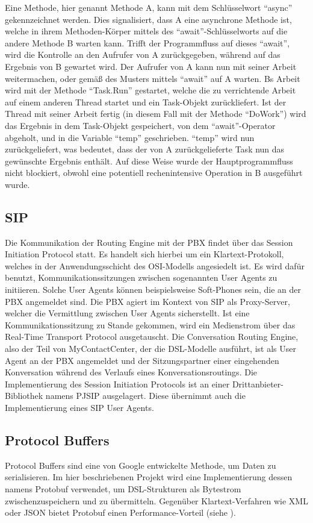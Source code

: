Eine Methode, hier genannt Methode A, kann mit dem Schlüsselwort ``async'' gekennzeichnet werden. Dies signalisiert, dass A eine asynchrone Methode ist, welche in ihrem Methoden-Körper mittels des ``await''-Schlüsselworts auf die andere Methode B warten kann. Trifft der Programmfluss auf dieses ``await'', wird die Kontrolle an den Aufrufer von A zurückgegeben, während auf das Ergebnis von B gewartet wird. Der Aufrufer von A kann nun mit seiner Arbeit weitermachen, oder gemäß des Musters mittels ``await'' auf A warten. Bs Arbeit wird mit der Methode ``Task.Run'' gestartet, welche die zu verrichtende Arbeit auf einem anderen Thread startet und ein Task-Objekt zurückliefert. Ist der Thread mit seiner Arbeit fertig (in diesem Fall mit der Methode ``DoWork'') wird das Ergebnis in dem Task-Objekt gespeichert, von dem ``await''-Operator abgeholt, und in die Variable ``temp'' geschrieben. ``temp'' wird nun zurückgeliefert, was bedeutet, dass der von A zurückgelieferte Task nun das gewünschte Ergebnis enthält. Auf diese Weise wurde der Hauptprogrammfluss nicht blockiert, obwohl eine potentiell rechenintensive Operation in B ausgeführt wurde.

\subsection{SIP}
Die Kommunikation der Routing Engine mit der PBX findet über das Session Initiation Protocol statt. Es handelt sich hierbei um ein Klartext-Protokoll, welches in der Anwendungsschicht des OSI-Modells angesiedelt ist. Es wird dafür benutzt, Kommunikationssitzungen zwischen sogenannten User Agents zu initiieren. Solche User Agents können beispielsweise Soft-Phones sein, die an der PBX angemeldet sind. Die PBX agiert im Kontext von SIP als Proxy-Server, welcher die Vermittlung zwischen User Agents sicherstellt. Ist eine Kommunikationssitzung zu Stande gekommen, wird ein Medienstrom über das Real-Time Transport Protocol ausgetauscht. Die Conversation Routing Engine, also der Teil von MyContactCenter, der die DSL-Modelle ausführt, ist als User Agent an der PBX angemeldet und der Sitzungspartner einer eingehenden Konversation während des Verlaufs eines Konversationsroutings. Die Implementierung des Session Initiation Protocols ist an einer Drittanbieter-Bibliothek namens PJSIP ausgelagert. Diese übernimmt auch die Implementierung eines SIP User Agents. 

\subsection{Protocol Buffers}
Protocol Buffers sind eine von Google entwickelte Methode, um Daten zu serialisieren. Im hier beschriebenen Projekt wird eine Implementierung dessen namens Protobuf verwendet, um DSL-Strukturen als Bytestrom zwischenzuspeichern und zu übermitteln. Gegenüber Klartext-Verfahren wie XML oder JSON bietet Protobuf einen Performance-Vorteil (siehe \cite{Bowden:14}).

